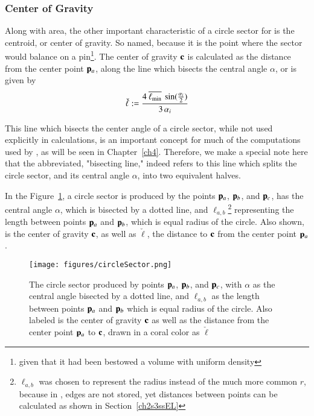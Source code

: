 \subsubsection{Center of Gravity}
\label{ch2sBssGsssCS}
Along with area, the other important characteristic of a circle sector for  is the centroid, or center of gravity. So named, because it is the point where the sector would balance on a pin\footnote{given that it had been bestowed a volume with uniform density}. The center of gravity $\mathbf{c}$ is calculated as the distance from the center point $\mathbf{p}_a$, along the line which bisects the central angle $\alpha$, or is given by
%
\begin{equation}
	\check{\ell} := \frac{4\:\overline{\ell_\text{min}}\:\sin(\frac{\alpha_i}{2})}{3\,\alpha_i}
	\label{eq:ch2distToCoG}
\end{equation}%
%

This line which bisects the center angle of a circle sector, while not used explicitly in calculations, is an important concept for much of the computations used by , as will be seen in Chapter~\ref{ch4}. Therefore, we make a special note here that the abbreviated, "bisecting line," indeed refers to this line which splits the circle sector, and its central angle $\alpha$, into two equivalent halves.%
%

In the Figure~\ref{fig:circleSector}, a circle sector is produced by the points $\mathbf{p}_a$, $\mathbf{p}_b$, and $\mathbf{p}_c$, has the central angle $\alpha$, which is bisected by a dotted line, and $\ell_{a,b}$\footnote{$\ell_{a,b}$ was chosen to represent the radius instead of the much more common $r$, because in \tdd{}, edges are not stored, yet distances between points can be calculated as shown in Section~\ref{ch2s3ssEL}} representing the length between points $\mathbf{p}_a$ and $\mathbf{p}_b$, which is equal radius of the circle. Also shown, is the center of gravity $\mathbf{c}$, as well as $\check{\ell}$, the distance to $\mathbf{c}$ from the center point $\mathbf{p}_a$.

\begin{figure}
\ffigbox
	{\texttt{[image: figures/circleSector.png]}}
	{\caption[A Circle Sector in Detail]{The circle sector produced by points $\mathbf{p}_a$, $\mathbf{p}_b$, and $\mathbf{p}_c$, with $\alpha$ as the central angle bisected by a dotted line, and $\ell_{a,b}$ as the length between points $\mathbf{p}_a$ and $\mathbf{p}_b$ which is equal radius of the circle. Also labeled is the center of gravity $\mathbf{c}$ as well as the distance from the center point $\mathbf{p}_a$ to $\mathbf{c}$, drawn in a coral color as $\check{\ell}$}\label{fig:circleSector}}
\end{figure}

